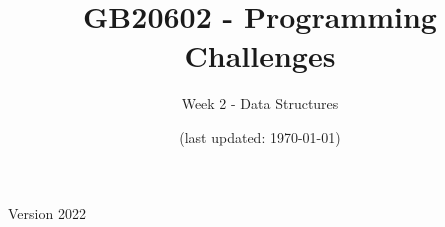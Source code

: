 \documentclass[aspectratio=169]{beamer}
\title[Programming Challenges]{GB20602 - Programming Challenges}
\subtitle[Week 2]{Week 2 - Data Structures}
\date[]{{\smaller(last updated: \today)}}
\begin{document}
\begin{CJK}{UTF8}{ipxm}

\begin{frame}
\maketitle
\vfill

\hfill Version 2022
\end{frame}



% 


% 


\end{CJK}
\end{document}
